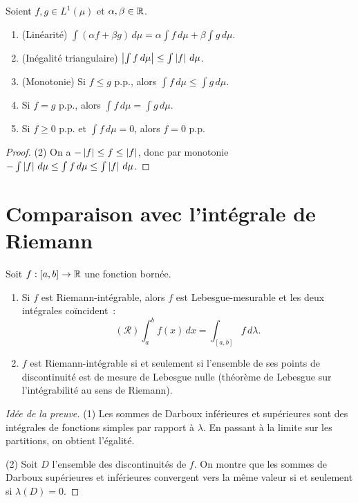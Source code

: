 \begin{theoreme}
\label{thm:proprietes_integrale}
Soient $f, g \in L^1(\mu)$ et $\alpha, \beta \in \mathbb{R}$.
\begin{enumerate}
    \item (Lin\'earit\'e) $\int (\alpha f + \beta g)\, d\mu =
    \alpha \int f\, d\mu + \beta \int g\, d\mu$.
    \item (In\'egalit\'e triangulaire)
    $\left| \int f\, d\mu \right| \leq \int \left| f \right|\, d\mu$.
    \item (Monotonie) Si $f \leq g$ p.p., alors
    $\int f\, d\mu \leq \int g\, d\mu$.
    \item Si $f = g$ p.p., alors $\int f\, d\mu = \int g\, d\mu$.
    \item Si $f \geq 0$ p.p. et $\int f\, d\mu = 0$, alors $f = 0$ p.p.
\end{enumerate}
\end{theoreme}

\begin{proof}
(2) On a $-\left| f \right| \leq f \leq \left| f \right|$, donc par monotonie
$-\int \left| f \right|\, d\mu \leq \int f\, d\mu \leq \int \left| f \right|\, d\mu$.
\end{proof}

\section{Comparaison avec l'int\'egrale de Riemann}

\begin{theoreme}
Soit $f : [a, b] \to \mathbb{R}$ une fonction born\'ee.
\begin{enumerate}
    \item Si $f$ est Riemann-int\'egrable, alors $f$ est Lebesgue-mesurable et
    les deux int\'egrales co\"incident~:
    \[
    (\mathcal{R})\!\int_a^b f(x)\, dx = \int_{[a,b]} f\, d\lambda.
    \]
    \item $f$ est Riemann-int\'egrable si et seulement si l'ensemble de ses points
    de discontinuit\'e est de mesure de Lebesgue nulle (th\'eor\`eme de Lebesgue
    sur l'int\'egrabilit\'e au sens de Riemann).
\end{enumerate}
\end{theoreme}

\begin{proof}[Id\'ee de la preuve]
(1) Les sommes de Darboux inf\'erieures et sup\'erieures sont des int\'egrales de
fonctions simples par rapport \`a $\lambda$. En passant \`a la limite sur les
partitions, on obtient l'\'egalit\'e.

(2) Soit $D$ l'ensemble des discontinuit\'es de $f$. On montre que les sommes de
Darboux sup\'erieures et inf\'erieures convergent vers la m\^eme valeur si et
seulement si $\lambda(D) = 0$.
\end{proof}

